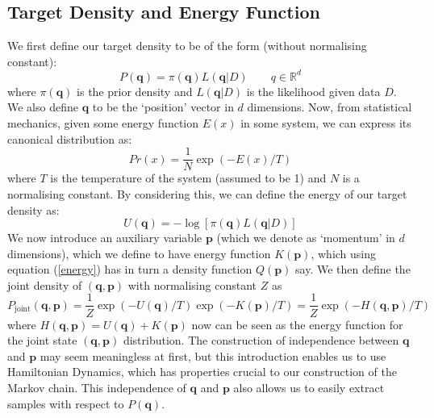 \documentclass[11pt]{article}
\begin{document}
\subsection{Target Density and Energy Function}
We first define our target density to be of the form (without normalising constant):
\begin{equation}
P(\mathbf{q})= \pi(\mathbf{q})L(\mathbf{q}|D) \quad \quad q \in \mathbb{R}^{d}
\end{equation}
where $\pi(\mathbf{q})$ is the prior density and $L(\mathbf{q}|D)$ is the likelihood given data $D$. 
We also define $\mathbf{q}$ to be the `position' vector in $d$ dimensions. Now, from statistical mechanics, given some energy function $E(x)$ in some system, we can express its canonical distribution as:
\begin{equation}
\label{energy}
Pr(x) = \frac{1}{N}\exp(-E(x)/T)
\end{equation}
where $T$ is the temperature of the system (assumed to be 1) and $N$ is a normalising constant. By considering this, we can define the energy of our target density as:
\begin{equation}
U(\mathbf{q}) = -\log [\pi(\mathbf{q})L(\mathbf{q}|D)]
\end{equation}
We now introduce an auxiliary variable $\mathbf{p}$ (which we denote as `momentum' in $d$ dimensions), which we define to have energy function $K(\mathbf{p})$, which using equation (\ref{energy}) has in turn a density function $Q(\mathbf{p})$ say. We then define the joint density of $(\mathbf{q},\mathbf{p})$ with normalising constant $Z$ as 
\begin{equation}
\label{joint}
P_{\text{joint}}(\mathbf{q},\mathbf{p}) = \frac{1}{Z}\exp(-U(\mathbf{q})/T)\exp(-K(\mathbf{p})/T) = \frac{1}{Z}\exp(-H(\mathbf{q},\mathbf{p})/T)
\end{equation}
where $H(\mathbf{q},\mathbf{p}) = U(\mathbf{q}) + K(\mathbf{p})$ now can be seen as the energy function for the joint state $(\mathbf{q},\mathbf{p})$ distribution. The construction of independence between $\mathbf{q}$ and $\mathbf{p}$ may seem meaningless at first, but this introduction enables us to use Hamiltonian Dynamics, which has properties crucial to our construction of the Markov chain. This independence of $\mathbf{q}$ and $\mathbf{p}$ also allows us to easily extract samples with respect to $P(\mathbf{q})$.
\end{document}
